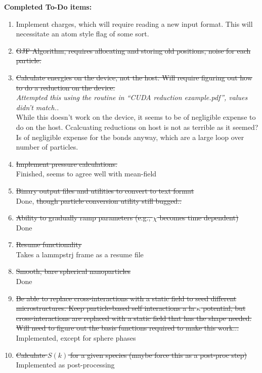 \documentclass[12pt]{article}
\begin{document}
{\bf Completed To-Do items:}
\begin{enumerate}
	
	\item
	Implement charges, which will require reading a new input format. This will necessitate an atom style flag of some sort.
	
	\item
	\sout{GJF Algorithm, requires allocating and storing old positions, noise for each particle.}
	
	\item
	\sout{Calculate energies on the device, not the host. Will require figuring out how to do a reduction on the device.}
	\\
	{\it Attempted this using the routine in ``CUDA reduction example.pdf'', values didn't match..}
	\\
	While this doesn't work on the device, it seems to be of negligible expense to do on the host. Ccalcuating reductions on host is not as terrible as it seemed? Is of negligible expense for the bonds anyway, which are a large loop over number of particles.
	
	\item
	\sout{Implement pressure calculations.}
	\\
	Finished, seems to agree well with mean-field
	
	
	\item
	\sout{Binary output files and utilities to convert to text format}
	\\
	Done, \sout{though particle conversion utility still bugged..}
	
	\item
	\sout{Ability to gradually ramp parameters (e.g., $\chi$ becomes time dependent)}
	\\
	Done
	
	\item
	\sout{Resume functionality}
	\\
	Takes a lammpstrj frame as a resume file

	\item
	\sout{Smooth, bare spherical nanoparticles}
	\\
	Done
	
\item
\sout{Be able to replace cross-interactions with a static field to seed different microstructures. Keep particle-based self interactions a la $\kappa$ potential, but cross-interactions are replaced with a static field that has the shape needed. Will need to figure out the basis functions required to make this work...}
\\
Implemented, except for sphere phases

	\item
	\sout{Calculate $S(k)$ for a given species (maybe force this as a post-proc step)}
	\\
	Implemented as post-processing
	
\end{enumerate}
\end{document}
